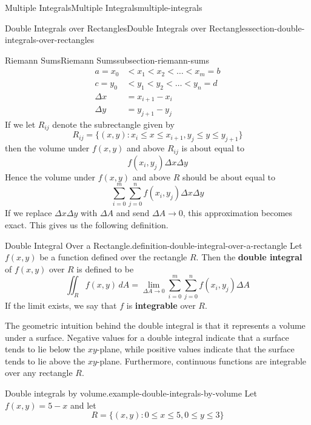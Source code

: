 \documentclass[oneside,10pt,]{book}
\newcommand{\terminology}[1]{\textbf{#1}}
\numberwithin{equation}{section}
\begin{document}
\begin{chapterptx}{Multiple Integrals}{}{Multiple Integrals}{}{}{multiple-integrals}
\begin{sectionptx}{Double Integrals over Rectangles}{}{Double Integrals over Rectangles}{}{}{section-double-integrals-over-rectangles}
\begin{subsectionptx}{Riemann Sums}{}{Riemann Sums}{}{}{subsection-riemann-sums}
\begin{align*}
a = x_{0} & < x_{1} < x_{2} < \dots < x_{m} = b \\
c = y_{0} & < y_{1} < y_{2} < \dots < y_{n} = d \\
\Delta x & = x_{i+1} - x_{i} \\
\Delta y & = y_{j+1} - y_{j} 
\end{align*}
If we let \(R_{ij}\) denote the subrectangle given by%
\begin{equation*}
R_{ij} = \{(x,y) : x_{i}\leq x\leq x_{i+1}, y_{j}\leq y\leq y_{j+1}\}
\end{equation*}
then the volume under \(f(x,y)\) and above \(R_{ij}\) is about equal to%
\begin{equation*}
f(x_{i},y_{j})\Delta x\Delta y
\end{equation*}
Hence the volume under \(f(x,y)\) and above \(R\) should be about equal to%
\begin{equation*}
\sum_{i=0}^{m}\sum_{j=0}^{n}f(x_{i},y_{j})\Delta x\Delta y
\end{equation*}
If we replace \(\Delta x\Delta y\) with \(\Delta A\) and send \(\Delta A\to0\), this approximation becomes exact. This gives us the following definition.%
\begin{definition}{Double Integral Over a Rectangle.}{definition-double-integral-over-a-rectangle}%
\hypertarget{p-1463}{}%
Let \(f(x,y)\) be a function defined over the rectangle \(R\). Then the \terminology{double integral} of \(f(x,y)\) over \(R\) is defined to be%
\begin{equation*}
\iint_{R}f(x,y)\,dA = \lim_{\Delta A\to0}\sum_{i=0}^{m}\sum_{j=0}^{n}f(x_{i},y_{j})\Delta A
\end{equation*}
If the limit exists, we say that \(f\) is \terminology{integrable} over \(R\).%
\end{definition}
\hypertarget{p-1464}{}%
The geometric intuition behind the double integral is that it represents a volume under a surface. Negative values for a double integral indicate that a surface tends to lie below the \(xy\)-plane, while positive values indicate that the surface tends to lie above the \(xy\)-plane. Furthermore, continuous functions are integrable over any rectangle \(R\).%
\begin{example}{Double integrals by volume.}{example-double-integrals-by-volume}%
\hypertarget{p-1465}{}%
Let \(f(x,y) = 5 - x\) and let%
\begin{equation*}
R = \{(x,y) : 0\leq x\leq 5, 0\leq y\leq 3\}
\end{equation*}

\end{example}
\end{subsectionptx}
\end{sectionptx}
\end{chapterptx}
\end{document}
